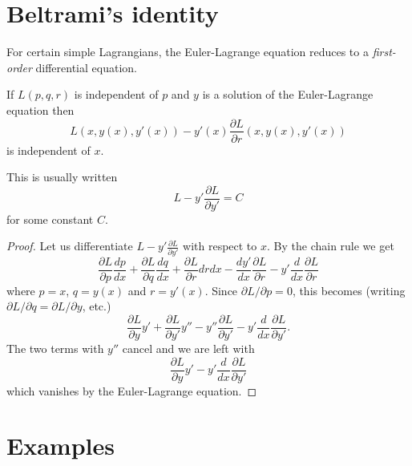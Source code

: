 \section{Beltrami's identity}

For certain simple Lagrangians, the Euler-Lagrange equation reduces to a {\em first-order} differential equation.

\begin{thm}
If $L(p,q,r)$ is independent of $p$ and $y$ is a solution of the Euler-Lagrange equation then
\[L(x,y(x),y'(x))-y'(x)\frac{\partial L}{\partial r}(x,y(x),y'(x))\]
is independent of $x$.
\end{thm}
\begin{rmk}
This is usually written
\[L-y'\frac{\partial L}{\partial y'}=C\]
for some constant $C$.
\end{rmk}
\begin{proof}
Let us differentiate $L-y'\frac{\partial L}{\partial y'}$ with respect to $x$. By the chain rule we get
\[\frac{\partial L}{\partial p}\frac{dp}{dx}+\frac{\partial L}{\partial q}\frac{dq}{dx}+\frac{\partial L}{\partial r}{dr}{dx}-\frac{dy'}{dx}\frac{\partial L}{\partial r}-y'\frac{d}{dx}\frac{\partial L}{\partial r}\]
where $p=x$, $q=y(x)$ and $r=y'(x)$. Since $\partial L/\partial p=0$, this becomes (writing $\partial L/\partial q=\partial L/\partial y$, etc.)
\[\frac{\partial L}{\partial y}y'+\frac{\partial L}{\partial y'}y''-y''\frac{\partial L}{\partial y'}-y'\frac{d}{dx}\frac{\partial L}{\partial y'}.\]
The two terms with $y''$ cancel and we are left with
\[\frac{\partial L}{\partial y}y'-y'\frac{d}{dx}\frac{\partial L}{\partial y'}\]
which vanishes by the Euler-Lagrange equation.
\end{proof}

\section{Examples}

